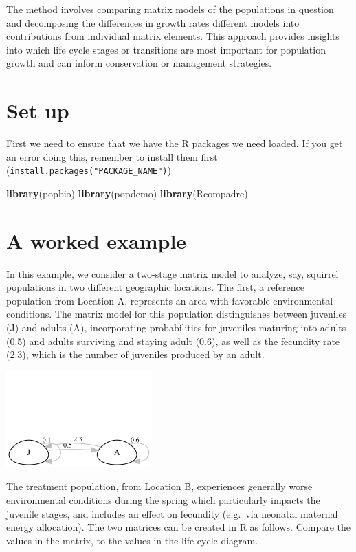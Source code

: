 \documentclass[
  a4paper]{book}
\newenvironment{Shaded}{\begin{snugshade}}{\end{snugshade}}
\newcommand{\FunctionTok}[1]{\textcolor[rgb]{0.13,0.29,0.53}{\textbf{#1}}}
\newcommand{\NormalTok}[1]{#1}
\begin{document}
The method involves comparing matrix models of the populations in question and decomposing the differences in growth rates different models into contributions from individual matrix elements. This approach provides insights into which life cycle stages or transitions are most important for population growth and can inform conservation or management strategies.

\section{Set up}\label{set-up}

First we need to ensure that we have the R packages we need loaded. If you get an error doing this, remember to install them first (\texttt{install.packages("PACKAGE\_NAME")})

\begin{Shaded}
\begin{Highlighting}[]
\FunctionTok{library}\NormalTok{(popbio)}
\FunctionTok{library}\NormalTok{(popdemo)}
\FunctionTok{library}\NormalTok{(Rcompadre)}
\end{Highlighting}
\end{Shaded}

\section{A worked example}\label{a-worked-example}

In this example, we consider a two-stage matrix model to analyze, say, squirrel populations in two different geographic locations. The first, a reference population from Location A, represents an area with favorable environmental conditions. The matrix model for this population distinguishes between juveniles (J) and adults (A), incorporating probabilities for juveniles maturing into adults (0.5) and adults surviving and staying adult (0.6), as well as the fecundity rate (2.3), which is the number of juveniles produced by an adult.

\includegraphics{tempLifeCycleDiagramLTRE.png}

The treatment population, from Location B, experiences generally worse environmental conditions during the spring which particularly impacts the juvenile stages, and includes an effect on fecundity (e.g.~via neonatal maternal energy allocation). The two matrices can be created in R as follows. Compare the values in the matrix, to the values in the life cycle diagram.
\end{document}
